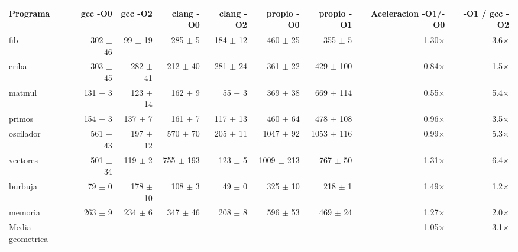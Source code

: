 \begin{tabular}{lrrrrrrrr}\toprule
Programa & gcc -O0 & gcc -O2 & clang -O0 & clang -O2 & propio -O0 & propio -O1 & Aceleracion -O1/-O0 & -O1 / gcc -O2 \\\midrule
fib & 302 $\pm$ 46 & 99 $\pm$ 19 & 285 $\pm$ 5 & 184 $\pm$ 12 & 460 $\pm$ 25 & 355 $\pm$ 5 & 1.30$\times$ & 3.6$\times$ \\
criba & 303 $\pm$ 45 & 282 $\pm$ 41 & 212 $\pm$ 40 & 281 $\pm$ 24 & 361 $\pm$ 22 & 429 $\pm$ 100 & 0.84$\times$ & 1.5$\times$ \\
matmul & 131 $\pm$ 3 & 123 $\pm$ 14 & 162 $\pm$ 9 & 55 $\pm$ 3 & 369 $\pm$ 38 & 669 $\pm$ 114 & 0.55$\times$ & 5.4$\times$ \\
primos & 154 $\pm$ 3 & 137 $\pm$ 7 & 161 $\pm$ 7 & 117 $\pm$ 13 & 460 $\pm$ 64 & 478 $\pm$ 108 & 0.96$\times$ & 3.5$\times$ \\
oscilador & 561 $\pm$ 43 & 197 $\pm$ 12 & 570 $\pm$ 70 & 205 $\pm$ 11 & 1047 $\pm$ 92 & 1053 $\pm$ 116 & 0.99$\times$ & 5.3$\times$ \\
vectores & 501 $\pm$ 34 & 119 $\pm$ 2 & 755 $\pm$ 193 & 123 $\pm$ 5 & 1009 $\pm$ 213 & 767 $\pm$ 50 & 1.31$\times$ & 6.4$\times$ \\
burbuja & 79 $\pm$ 0 & 178 $\pm$ 10 & 108 $\pm$ 3 & 49 $\pm$ 0 & 325 $\pm$ 10 & 218 $\pm$ 1 & 1.49$\times$ & 1.2$\times$ \\
memoria & 263 $\pm$ 9 & 234 $\pm$ 6 & 347 $\pm$ 46 & 208 $\pm$ 8 & 596 $\pm$ 53 & 469 $\pm$ 24 & 1.27$\times$ & 2.0$\times$ \\
\midrule
Media geometrica &  &  &  &  &  &  & 1.05$\times$ & 3.1$\times$ \\
\bottomrule\end{tabular}
